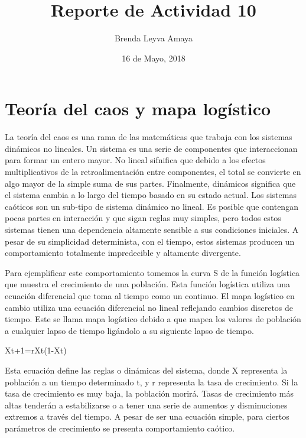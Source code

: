 \documentclass{article} %
\title{Reporte de Actividad 10}
\author{Brenda Leyva Amaya}
\date{16 de Mayo, 2018}
\begin{document}
\maketitle %

\section*{Teoría del caos y mapa logístico}

La teoría del caos es una rama de las matemáticas que trabaja con los sistemas dinámicos no lineales. Un sistema es una serie de componentes que interaccionan para formar un entero mayor. No lineal sifnifica que debido a los efectos multiplicativos de la retroalimentación entre componentes, el total se convierte en algo mayor de la simple suma de sus partes. Finalmente, dinámicos significa que el sistema cambia a lo largo del tiempo basado en su estado actual. Los sistemas caóticos son un sub-tipo de sistema dinámico no lineal. Es posible que contengan pocas partes en interacción y que sigan reglas muy simples, pero todos estos sistemas tienen una dependencia altamente sensible a sus condiciones iniciales. A pesar de su simplicidad determinista, con el tiempo, estos sistemas producen un comportamiento totalmente impredecible y altamente divergente. 

\vspace{0.5 cm}

Para ejemplificar este comportamiento tomemos la curva S de la función logística que muestra el crecimiento de una población. Esta función logística utiliza una ecuación diferencial que toma al tiempo como un continuo. El mapa logístico en cambio utiliza una ecuación diferencial no lineal reflejando cambios discretos de tiempo. Este se llama mapa logístico debido a que mapea los valores de población a cualquier lapso de tiempo ligándolo a su siguiente lapso de tiempo.

\vspace{0.5 cm}

Xt+1=rXt(1-Xt)

\vspace{0.5 cm}

Esta ecuación define las reglas o dinámicas del sistema, donde X representa la población a un tiempo determinado t, y r representa la tasa de crecimiento. Si la tasa de crecimiento es muy baja, la población morirá. Tasas de crecimiento más altas tenderán a estabilizarse o a tener una serie de aumentos y disminuciones extremos a través del tiempo. A pesar de ser una ecuación simple, para ciertos parámetros de crecimiento se presenta comportamiento caótico. 
\end{document}

